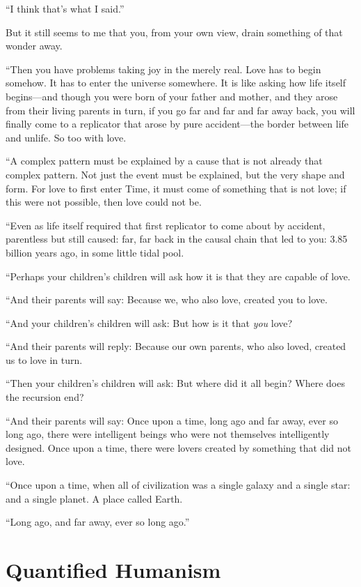  ``I think that's what I
said.''


 But it still seems to me that you, from your own view, drain
something of that wonder away.


 ``Then you have problems taking joy in the merely
real. Love has to begin somehow. It has to enter the universe
somewhere. It is like asking how life itself begins---and though you
were born of your father and mother, and they arose from their living
parents in turn, if you go far and far and far away back, you will
finally come to a replicator that arose by pure accident---the border
between life and unlife. So too with love.


 ``A complex pattern must be explained by a cause
that is not already that complex pattern. Not just the event must be
explained, but the very shape and form. For love to first enter Time,
it must come of something that is not love; if this were not possible,
then love could not be.


 ``Even as life itself required that first
replicator to come about by accident, parentless but still caused: far,
far back in the causal chain that led to you: 3.85 billion years ago,
in some little tidal pool.


 ``Perhaps your children's
children will ask how it is that they are capable of love.


 ``And their parents will say: Because we, who
also love, created you to love.


 ``And your children's children
will ask: But how is it that \textit{you} love?


 ``And their parents will reply: Because our own
parents, who also loved, created us to love in turn.


 ``Then your children's children
will ask: But where did it all begin? Where does the recursion end?


 ``And their parents will say: Once upon a time,
long ago and far away, ever so long ago, there were intelligent beings
who were not themselves intelligently designed. Once upon a time, there
were lovers created by something that did not love.


 ``Once upon a time, when all of civilization was
a single galaxy and a single star: and a single planet. A place called
Earth.


 ``Long ago, and far away, ever so long
ago.''

\myendsectiontext

\chapter{Quantified Humanism}

